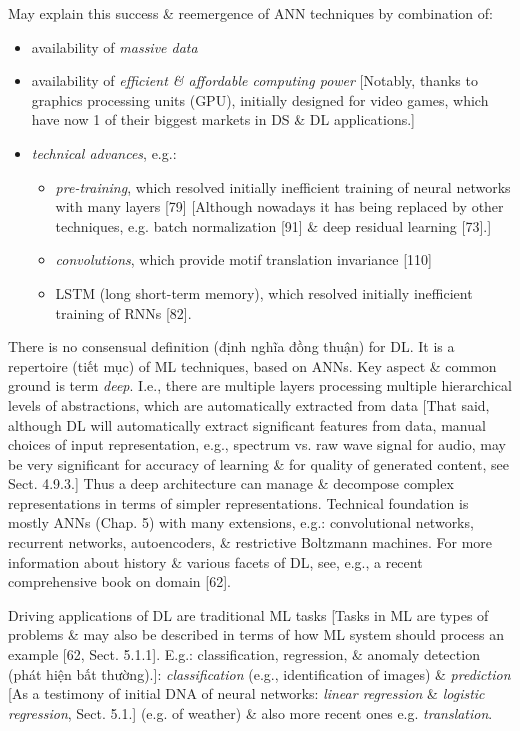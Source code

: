 \documentclass{article}
\begin{document}
\begin{itemize}
	May explain this success \& reemergence of ANN techniques by combination of:
	\begin{itemize}
		\item availability of {\it massive data}
		\item availability of {\it efficient \& affordable computing power} [Notably, thanks to graphics processing units (GPU), initially designed for video games, which have now 1 of their biggest markets in DS \& DL applications.]
		\item {\it technical advances}, e.g.:
		\begin{itemize}
			\item {\it pre-training}, which resolved initially inefficient training of neural networks with many layers [79] [Although nowadays it has being replaced by other techniques, e.g. batch normalization [91] \& deep residual learning [73].]
			\item {\it convolutions}, which provide motif translation invariance [110]
			\item LSTM (long short-term memory), which resolved initially inefficient training of RNNs [82].
		\end{itemize}
	\end{itemize}
	There is no consensual definition (định nghĩa đồng thuận) for DL. It is a repertoire (tiết mục) of ML techniques, based on ANNs. Key aspect \& common ground is term {\it deep}. I.e., there are multiple layers processing multiple hierarchical levels of abstractions, which are automatically extracted from data [That said, although DL will automatically extract significant features from data, manual choices of input representation, e.g., spectrum vs. raw wave signal for audio, may be very significant for accuracy of learning \& for quality of generated content, see Sect. 4.9.3.] Thus a deep architecture can manage \& decompose complex representations in terms of simpler representations. Technical foundation is mostly ANNs (Chap. 5) with many extensions, e.g.: convolutional networks, recurrent networks, autoencoders, \& restrictive Boltzmann machines. For more information about history \& various facets of DL, see, e.g., a recent comprehensive book on domain [62].

	Driving applications of DL are traditional ML tasks [Tasks in ML are types of problems \& may also be described in terms of how ML system should process an example [62, Sect. 5.1.1]. E.g.: classification, regression, \& anomaly detection (phát hiện bất thường).]: {\it classification} (e.g., identification of images) \& {\it prediction} [As a testimony of initial DNA of neural networks: {\it linear regression} \& {\it logistic regression}, Sect. 5.1.] (e.g. of weather) \& also more recent ones e.g. {\it translation}.


\end{itemize}
\end{document}
